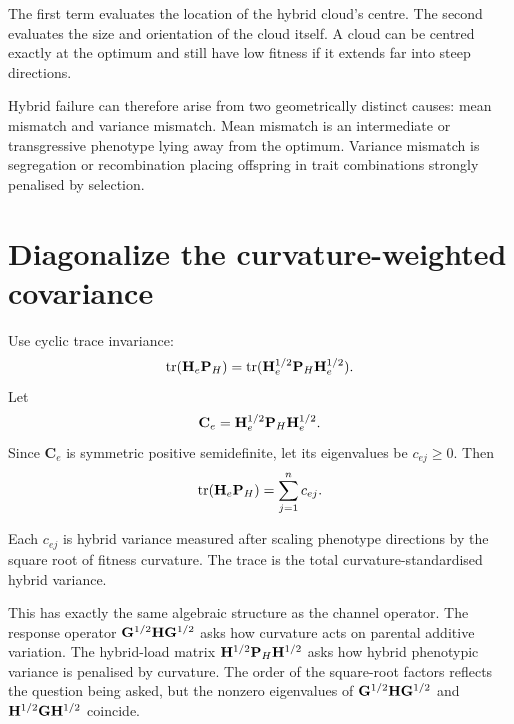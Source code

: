 \begin{geombox}
The first term evaluates the location of the hybrid cloud's centre. The second evaluates the size and orientation of the cloud itself. A cloud can be centred exactly at the optimum and still have low fitness if it extends far into steep directions.
\end{geombox}

\begin{biobox}
Hybrid failure can therefore arise from two geometrically distinct causes: mean mismatch and variance mismatch. Mean mismatch is an intermediate or transgressive phenotype lying away from the optimum. Variance mismatch is segregation or recombination placing offspring in trait combinations strongly penalised by selection.
\end{biobox}

\section{Diagonalize the curvature-weighted covariance}

Use cyclic trace invariance:
\begin{equation}
\operatorname{tr}(\mathbf{H}_e\mathbf{P}_H)
=\operatorname{tr}(\mathbf{H}_e^{1/2}\mathbf{P}_H\mathbf{H}_e^{1/2}).
\end{equation}
Let
\begin{equation}
\mathbf C_e=\mathbf{H}_e^{1/2}\mathbf{P}_H\mathbf{H}_e^{1/2}.
\end{equation}
Since \(\mathbf C_e\) is symmetric positive semidefinite, let its eigenvalues be \(c_{ej}\ge0\). Then
\begin{equation}
\operatorname{tr}(\mathbf{H}_e\mathbf{P}_H)=\sum_{j=1}^nc_{ej}.
\end{equation}

\inwords Each \(c_{ej}\) is hybrid variance measured after scaling phenotype directions by the square root of fitness curvature. The trace is the total curvature-standardised hybrid variance.

\begin{connectionbox}
This has exactly the same algebraic structure as the channel operator. The response operator \(\mathbf{G}^{1/2}\mathbf{H}\mathbf{G}^{1/2}\) asks how curvature acts on parental additive variation. The hybrid-load matrix \(\mathbf{H}^{1/2}\mathbf{P}_H\mathbf{H}^{1/2}\) asks how hybrid phenotypic variance is penalised by curvature. The order of the square-root factors reflects the question being asked, but the nonzero eigenvalues of \(\mathbf{G}^{1/2}\mathbf{H}\mathbf{G}^{1/2}\) and \(\mathbf{H}^{1/2}\mathbf{G}\mathbf{H}^{1/2}\) coincide.
\end{connectionbox}
